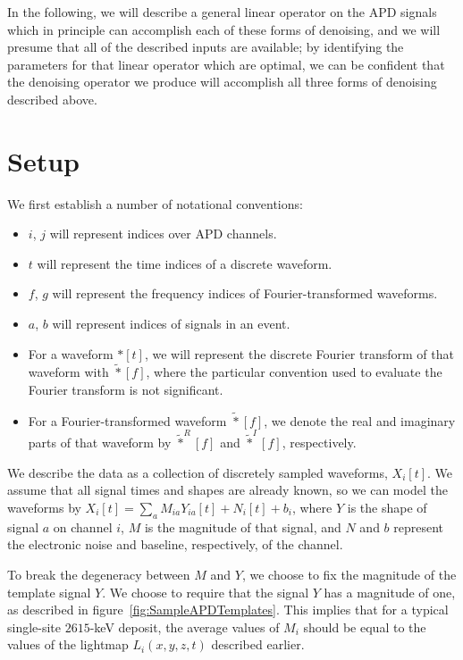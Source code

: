 In the following, we will describe a general linear operator on the APD signals which in principle can accomplish each of these forms of denoising, and we will presume that all of the described inputs are available; by identifying the parameters for that linear operator which are optimal, we can be confident that the denoising operator we produce will accomplish all three forms of denoising described above.

\section{Setup}

We first establish a number of notational conventions:
\begin{itemize}
\item $i$, $j$ will represent indices over APD channels.
\item $t$ will represent the time indices of a discrete waveform.
\item $f$, $g$ will represent the frequency indices of Fourier-transformed waveforms.
\item $a$, $b$ will represent indices of signals in an event.
\item For a waveform $*[t]$, we will represent the discrete Fourier transform of that waveform with $\widetilde{*}[f]$, where the particular convention used to evaluate the Fourier transform is not significant.
\item For a Fourier-transformed waveform $\widetilde{*}[f]$, we denote the real and imaginary parts of that waveform by $\widetilde{*}^R[f]$ and $\widetilde{*}^I[f]$, respectively.
\end{itemize}

We describe the data as a collection of discretely sampled waveforms, $X_i[t]$.  We assume that all signal times and shapes are already known, so we can model the waveforms by $X_i[t] = \sum_a M_{ia}Y_{ia}[t] + N_i[t] + b_i$, where $Y$ is the shape of signal $a$ on channel $i$, $M$ is the magnitude of that signal, and $N$ and $b$ represent the electronic noise and baseline, respectively, of the channel.

To break the degeneracy between $M$ and $Y$, we choose to fix the magnitude of the template signal $Y$.  We choose to require that the signal $Y$ has a magnitude of one, as described in figure~\ref{fig:SampleAPDTemplates}.  This implies that for a typical single-site $2615$-keV deposit, the average values of $M_i$ should be equal to the values of the lightmap $L_i(x,y,z,t)$ described earlier.

